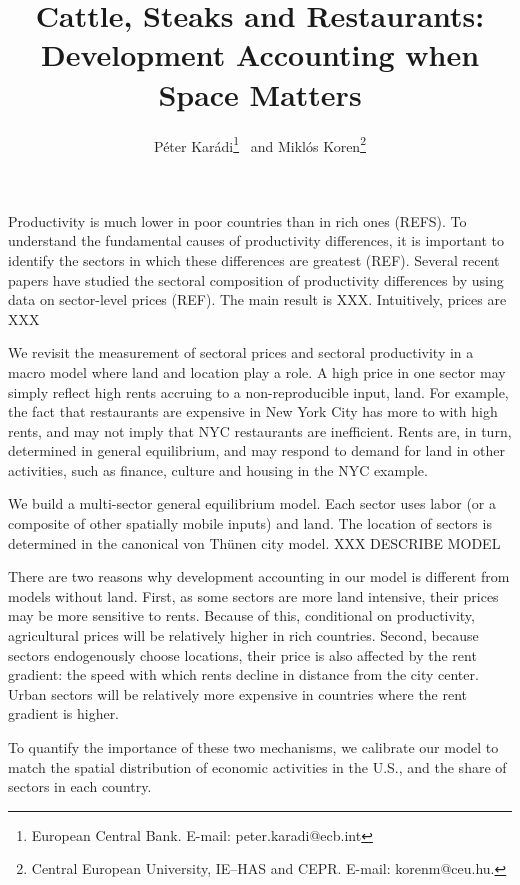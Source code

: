 \documentclass[12pt]{article}
\begin{document}
\title{Cattle, Steaks and Restaurants: Development Accounting when Space Matters}
\author{P\'eter Kar\'adi\thanks{European Central Bank. E-mail: peter.karadi@ecb.int}~ and Mikl\'os Koren\thanks{Central European University, IE--HAS and CEPR. E-mail: korenm@ceu.hu.}}
\maketitle

\begin{abstract}
\end{abstract}

Productivity is much lower in poor countries than in rich ones (REFS). To understand the fundamental causes of productivity differences, it is important to identify the sectors in which these differences are greatest (REF). Several recent papers have studied the sectoral composition of productivity differences by using data on sector-level prices (REF). The main result is XXX. Intuitively, prices are XXX

We revisit the measurement of sectoral prices and sectoral productivity in a macro model where land and location play a role. A high price in one sector may simply reflect high rents accruing to a non-reproducible input, land. For example, the fact that restaurants are expensive in New York City has more to with high rents, and may not imply that NYC restaurants are inefficient. Rents are, in turn, determined in general equilibrium, and may respond to demand for land in other activities, such as finance, culture and housing in the NYC example.

We build a multi-sector general equilibrium model. Each sector uses labor (or a composite of other spatially mobile inputs) and land. The location of sectors is determined in the canonical von Thünen city model. XXX DESCRIBE MODEL

There are two reasons why development accounting in our model is different from models without land. First, as some sectors are more land intensive, their prices may be more sensitive to rents. Because of this, conditional on productivity, agricultural prices will be relatively higher in rich countries. Second, because sectors endogenously choose locations, their price is also affected by the rent gradient: the speed with which rents decline in distance from the city center. Urban sectors will be relatively more expensive in countries where the rent gradient is higher.

To quantify the importance of these two mechanisms, we calibrate our model to match the spatial distribution of economic activities in the U.S., and the share of sectors in each country.
\end{document}
